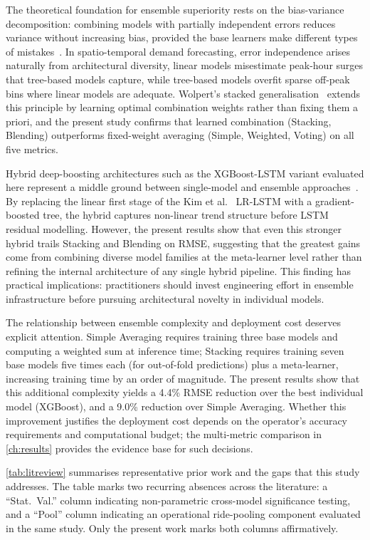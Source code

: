 The theoretical foundation for ensemble superiority rests on the bias-variance decomposition: combining models with partially independent errors reduces variance without increasing bias, provided the base learners make different types of mistakes~\parencite{breiman2001rf}. In spatio-temporal demand forecasting, error independence arises naturally from architectural diversity, linear models misestimate peak-hour surges that tree-based models capture, while tree-based models overfit sparse off-peak bins where linear models are adequate. Wolpert's stacked generalisation~\parencite{wolpert1992stacking} extends this principle by learning optimal combination weights rather than fixing them a priori, and the present study confirms that learned combination (Stacking, Blending) outperforms fixed-weight averaging (Simple, Weighted, Voting) on all five metrics.

Hybrid deep-boosting architectures such as the XGBoost-LSTM variant evaluated here represent a middle ground between single-model and ensemble approaches~\parencite{zheng2020hybrid}. By replacing the linear first stage of the Kim et al.~\parencite{kim2020hybrid} LR-LSTM with a gradient-boosted tree, the hybrid captures non-linear trend structure before LSTM residual modelling. However, the present results show that even this stronger hybrid trails Stacking and Blending on RMSE, suggesting that the greatest gains come from combining diverse model families at the meta-learner level rather than refining the internal architecture of any single hybrid pipeline. This finding has practical implications: practitioners should invest engineering effort in ensemble infrastructure before pursuing architectural novelty in individual models.

The relationship between ensemble complexity and deployment cost deserves explicit attention. Simple Averaging requires training three base models and computing a weighted sum at inference time; Stacking requires training seven base models five times each (for out-of-fold predictions) plus a meta-learner, increasing training time by an order of magnitude. The present results show that this additional complexity yields a 4.4\% RMSE reduction over the best individual model (XGBoost), and a 9.0\% reduction over Simple Averaging. Whether this improvement justifies the deployment cost depends on the operator's accuracy requirements and computational budget; the multi-metric comparison in \autoref{ch:results} provides the evidence base for such decisions.

\autoref{tab:litreview} summarises representative prior work and the gaps that this study addresses. The table marks two recurring absences across the literature: a ``Stat.\ Val.'' column indicating non-parametric cross-model significance testing, and a ``Pool'' column indicating an operational ride-pooling component evaluated in the same study. Only the present work marks both columns affirmatively.

